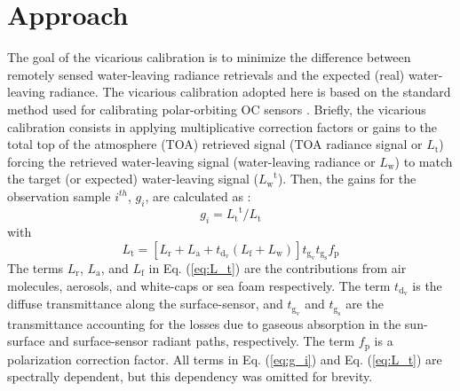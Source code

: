 \documentclass[]{interact}
\theoremstyle{plain}%
\theoremstyle{definition}
\theoremstyle{remark}
\begin{document}
\section{Approach}
The goal of the vicarious calibration is to minimize the difference between remotely sensed water-leaving radiance retrievals and the expected (real) water-leaving radiance. The vicarious calibration adopted here is based on the standard method used for calibrating polar-orbiting OC sensors \citep{Franz:07}. Briefly, the vicarious calibration consists in applying multiplicative correction factors or gains to the total top of the atmosphere (TOA) retrieved signal (TOA radiance signal or $L_\text{t}$) forcing the retrieved water-leaving signal (water-leaving radiance or $L_\text{w}$) to match the target (or expected) water-leaving signal (${L_\text{w}}^\text{t}$). Then, the gains for the observation sample $i^{th}$, $g_i$, are calculated as \citep{Franz:07}:
\begin{equation}\label{eq:g_i}
  g_i={L_\text{t}}^\text{t}/L_\text{t}
\end{equation}
with
\begin{equation}\label{eq:L_t}
  L_\text{t}=[L_\text{r}+L_\text{a}+t_{\text{d}_\text{v}}(L_\text{f}+L_\text{w})]t_{\text{g}_\text{v}}t_{\text{g}_\text{s}}f_\text{p}
\end{equation}
The terms $L_\text{r}$, $L_\text{a}$, and $L_\text{f}$ in Eq. (\ref{eq:L_t}) are the contributions from air molecules, aerosols, and white-caps or sea foam respectively. The term $t_{\text{d}_\text{v}}$ is the diffuse transmittance along the surface-sensor, and $t_{\text{g}_\text{v}}$ and $t_{\text{g}_\text{s}}$  are the transmittance accounting for the losses due to gaseous absorption in the sun-surface and surface-sensor radiant paths, respectively. The term $f_\text{p}$ is a polarization correction factor. All terms in Eq. (\ref{eq:g_i}) and Eq. (\ref{eq:L_t}) are spectrally dependent, but this dependency was omitted for brevity.
\end{document}
